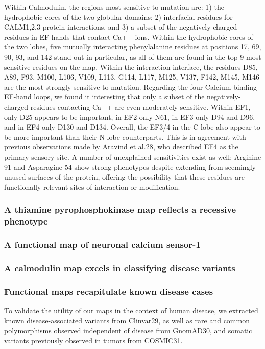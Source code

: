 Within Calmodulin, the regions most sensitive to mutation are: 1) the hydrophobic cores of the two globular domains; 2) interfacial residues for CALM1,2,3 protein interactions, and 3) a subset of the negatively charged residues in EF hands that contact Ca++ ions. Within the hydrophobic cores of the two lobes, five mutually interacting phenylalanine residues at positions 17, 69, 90, 93, and 142 stand out in particular, as all of them are found in the top 9 most sensitive residues on the map. Within the interaction interface, the residues D85, A89, F93, M100, L106, V109, L113, G114, L117, M125, V137, F142, M145, M146 are the most strongly sensitive to mutation. Regarding the four Calcium-binding EF-hand loops, we found it interesting that only a subset of the negatively-charged residues contacting Ca++ are even moderately sensitive. Within EF1, only D25 appears to be important, in EF2 only N61, in EF3 only D94 and D96, and in EF4 only D130 and D134. Overall, the EF3/4 in the C-lobe also appear to be more important than their N-lobe counterparts. This is in agreement with previous observations made by Aravind et al.28, who described EF4 as the primary sensory site. A number of unexplained sensitivities exist as well: Arginine 91 and Asparagine 54 show strong phenotypes despite extending from seemingly unused surfaces of the protein, offering the possibility that these residues are functionally relevant sites of interaction or modification.


\subsubsection{A thiamine pyrophosphokinase map reflects a recessive phenotype}

\subsubsection{A functional map of neuronal calcium sensor-1}

\subsubsection{A calmodulin map excels in classifying disease variants}

\subsubsection{Functional maps recapitulate known disease cases}

To validate the utility of our maps in the context of human disease, we extracted known disease-associated variants from Clinvar29, as well as rare and common polymorphisms observed independent of disease from GnomAD30, and somatic variants previously observed in tumors from COSMIC31. 

